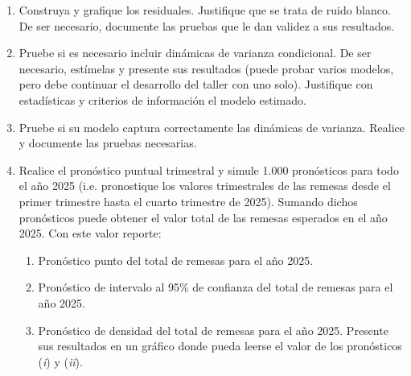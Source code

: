 \documentclass{article}
\theoremstyle{remark}
\theoremstyle{definition}
\begin{document}
\begin{enumerate}[label=\emph{\alph*})]
\begin{tcolorbox}[title=Soluci\'on 3.e]
        \end{tcolorbox}
    \item {Construya y grafique los residuales. Justifique que se trata de ruido blanco. De ser necesario, documente las pruebas que le dan validez a sus resultados.}
        \begin{tcolorbox}[title=Soluci\'on 3.f]
            
        \end{tcolorbox}
    \item {Pruebe si es necesario incluir din\'amicas de varianza condicional. De ser necesario, est\'imelas y presente sus resultados (puede probar varios modelos, pero debe continuar el desarrollo del taller con uno solo). Justifique con estad\'isticas y criterios de informaci\'on el modelo estimado.}
        \begin{tcolorbox}[title=Soluci\'on 3.g]
            
        \end{tcolorbox}
    \item {Pruebe si su modelo captura correctamente las din\'amicas de varianza. Realice y documente las pruebas necesarias.}
        \begin{tcolorbox}[title=Soluci\'on 3.h]
            
        \end{tcolorbox}
    \item {Realice el pron\'ostico puntual trimestral y simule 1.000 pron\'osticos para todo el año 2025 (i.e. pronostique los valores trimestrales de las remesas desde el primer trimestre hasta el cuarto trimestre de 2025). Sumando dichos pron\'osticos puede obtener el valor total de las remesas esperados en el año 2025. Con este valor reporte:}
    \begin{enumerate}[label=(\emph{\roman*})]
        \item {Pron\'ostico punto del total de remesas para el año 2025.}
            \begin{tcolorbox}[title=Soluci\'on 3.i.i]
            
            \end{tcolorbox}
        \item {Pron\'ostico de intervalo al 95\% de confianza del total de remesas para el año 2025.}
            \begin{tcolorbox}[title=Soluci\'on 3.i.ii]
            
            \end{tcolorbox}
        \item {Pron\'ostico de densidad del total de remesas para el año 2025. Presente sus resultados en un gr\'afico donde pueda leerse el valor de los pron\'osticos (\emph{i}) y (\emph{ii}).}
            \begin{tcolorbox}[title=Soluci\'on 3.i.iii]
            
            \end{tcolorbox}
    \end{enumerate}
\end{enumerate}

\nocite{*}

\printbibliography
\end{document}
